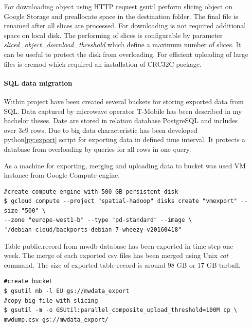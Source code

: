 \documentclass[a4paper,12pt,oneside]{report}
\begin{document}
For downloading object using HTTP request gsutil perform slicing object on Google Storage  and preallocate 
space in the destination folder. The final file is renamed after all slices are processed. For downloading 
is not required additional space on local disk. 
The performing of slices is configurable by parameter \textit{sliced\_object\_download\_threshold} which 
define a maximum number of slices. It can be 
useful to protect the disk from overloading. For efficient uploading of large files is crcmod which required 
an installation  of CRC32C package. 

\paragraph{SQL data migration} Within project have been created several buckets for storing exported 
data from SQL. Data captured by microwave operator T-Mobile has been described in my bachelor theses\cite{bp_krejci}. 
Date are stored in relation database 
PostgreSQL and includes over $3e9$ rows. Due to big data characteristic has been developed python\ref{py:export} 
script for exporting data in defined time 
interval. It protects a database from overloading by queries for all rows in one query. 

As a machine for exporting, merging and uploading data to bucket was used VM instance from Google Compute engine.

\begin{footnotesize}
\begin{lstlisting}[style=mybash]
#create compute engine with 500 GB persistent disk
$ gcloud compute --project "spatial-hadoop" disks create "vmexport" --size "500" \
--zone "europe-west1-b" --type "pd-standard" --image \
"/debian-cloud/backports-debian-7-wheezy-v20160418"
\end{lstlisting}
\end{footnotesize}
 
Table public.record from mwdb database has been exported in time step one week. The merge of each exported 
csv files has been merged using Unix \textit{cat} command. The size of exported table record is around 98 GB or 17 GB tarball.


\begin{footnotesize}
\begin{lstlisting}[style=mybash]
#create bucket 
$ gsutil mb -l EU gs://mwdata_export
#copy big file with slicing
$ gsutil -m -o GSUtil:parallel_composite_upload_threshold=100M cp \
mwdump.csv gs://mwdata_export/
\end{lstlisting}
\end{footnotesize}
 
\end{document}
